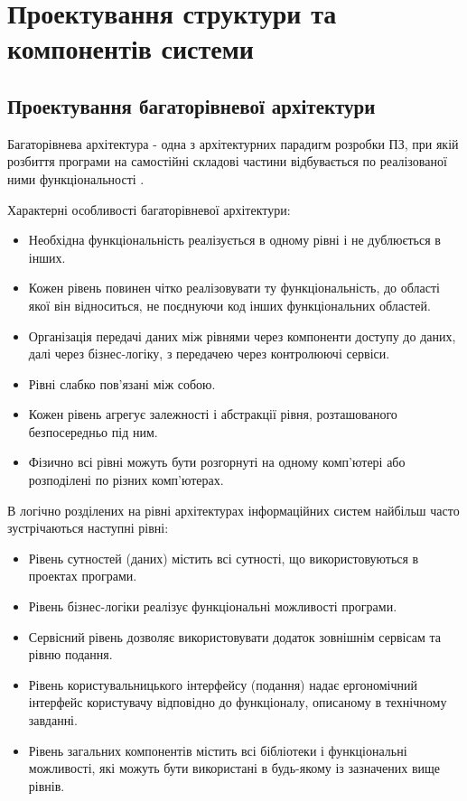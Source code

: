 \section{Проектування структури та компонентів системи}

\subsection{Проектування багаторівневої архітектури}

Багаторівнева архітектура - одна з архітектурних парадигм розробки ПЗ,
при якій розбиття програми на самостійні складові частини відбувається
по реалізованої ними функціональності \cite{multitier-thesis}.

Характерні особливості багаторівневої архітектури:
\begin{itemize}
		\item Необхідна функціональність реалізується в одному рівні і не дублюється в інших.
		\item Кожен рівень повинен чітко реалізовувати ту функціональність,
			до області якої він відноситься, не поєднуючи код інших функціональних областей.
		\item Організація передачі даних між рівнями через компоненти доступу до даних,
			далі через бізнес-логіку, з передачею через контролюючі сервіси.
		\item Рівні слабко пов'язані між собою.
		\item Кожен рівень агрегує залежності і абстракції рівня,
			розташованого безпосередньо під ним.
		\item Фізично всі рівні можуть бути розгорнуті на одному комп'ютері або
			розподілені по різних комп'ютерах.
\end{itemize}

В логічно розділених на рівні архітектурах інформаційних систем найбільш
часто зустрічаються наступні рівні:

\begin{itemize}
		\item Рівень сутностей (даних) містить всі сутності, що використовуються в проектах програми.
		\item Рівень бізнес-логіки реалізує функціональні можливості програми.
		\item Сервісний рівень дозволяє використовувати додаток зовнішнім сервісам та рівню подання.
		\item Рівень користувальницького інтерфейсу (подання) надає ергономічний інтерфейс користувачу
			відповідно до функціоналу, описаному в технічному завданні.
		\item Рівень загальних компонентів містить всі бібліотеки і функціональні можливості,
			які можуть бути використані в будь-якому із зазначених вище рівнів.
\end{itemize}

